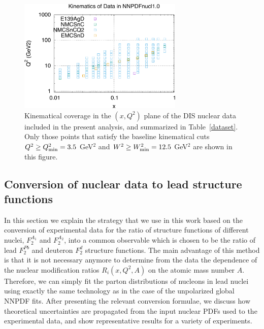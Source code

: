 \begin{figure}[t]
\begin{center}
  \includegraphics[width=0.70\textwidth]{plots/kinplot.pdf}
 \end{center}
\vspace{-0.3cm}
\caption{\small Kinematical coverage in the $(x,Q^2)$ plane
  of the DIS nuclear data included in the present analysis,
  and summarized in Table~\ref{dataset}.
  Only those points that satisfy the baseline kinematical
  cuts $Q^2 \ge Q^2_{\rm min}=3.5$ GeV$^2$ and $W^2 \ge W^2_{\rm min}=12.5$
GeV$^2$ are shown in this figure.
}
\label{figkinplot}
\end{figure}



\subsection{Conversion of nuclear data to lead structure functions}
\label{sec:conversion}

In this section we explain the strategy that we use in this work based on the conversion of
experimental data for the ratio of structure functions of different nuclei, $F_2^{A_1}$ and $F_2^{A_2}$, into
a common observable which is chosen to be the ratio of lead $F_2^{Pb}$ and deuteron $F_2^d$ structure
functions.
%
The main advantage of this method is that it is not necessary anymore to determine from the data the
dependence of the nuclear modification ratios $R_{i}(x,Q^2,A)$ on the atomic mass number $A$.
%
Therefore, we can simply fit the parton distributions of nucleons in lead nuclei using exactly
the same technology as in the case of the unpolarized global NNPDF fits.
%
After presenting the  relevant conversion formulae,
we discuss how theoretical uncertainties are propagated from
the input nuclear PDFs used to the experimental data,
and show representative results for a variety of experiments.

